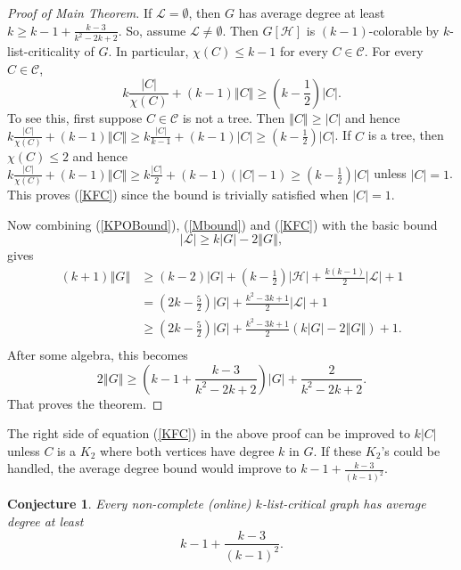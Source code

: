 \documentclass[12pt]{article}
\theoremstyle{plain}
\newtheorem*{TheConjecture}{Conjecture}
\theoremstyle{definition}
\theoremstyle{remark}
\newcommand{\fancy}[1]{\mathcal{#1}}
\newcommand{\C}[1]{\fancy{C}_{#1}}
\renewcommand{\L}{\fancy{L}}
\newcommand{\HH}{\fancy{H}}
\newcommand{\card}[1]{\left|#1\right|}
\newcommand{\size}[1]{\left\Vert#1\right\Vert}
\newcommand{\parens}[1]{\left( #1 \right)}
\def\C{\fancy{C}}
\begin{document}
\begin{proof}[Proof of Main Theorem]
	If $\L = \emptyset$, then $G$ has average degree at least $k \ge k-1 + \frac{k-3}{k^2-2k+2}$.  So, assume $\L \ne \emptyset$.  Then $G[\HH]$ is $(k-1)$-colorable by $k$-list-criticality of $G$. In particular, $\chi(C) \le k-1$ for every $C \in \C$.
	For every $C \in \C$,
	\begin{equation}
	 k\frac{\card{C}}{\chi(C)} + (k-1)\size{C} \ge \parens{k - \frac12}\card{C}.
	 \label{KFC}
	\end{equation}
	To see this, first suppose $C \in \C$ is not a tree. Then $\size{C} \ge \card{C}$ and hence $k\frac{\card{C}}{\chi(C)} + (k-1)\size{C} \ge k\frac{\card{C}}{k-1} + (k-1)\card{C} \ge (k - \frac12)\card{C}$.  If $C$ is a tree, then $\chi(C) \le 2$ and hence 
	$k\frac{\card{C}}{\chi(C)} + (k-1)\size{C} \ge k\frac{\card{C}}{2} + (k-1)(\card{C} - 1) \ge (k-\frac12)\card{C}$ unless $\card{C} = 1$.  This proves (\ref{KFC}) since the bound is trivially satisfied when $\card{C} = 1$.
	
	Now combining (\ref{KPOBound}), (\ref{Mbound}) and (\ref{KFC}) with the basic bound
	\begin{equation*}
	  \card{\L} \ge k\card{G} - 2\size{G},
	\end{equation*}	
	gives
	\begin{align*}
	(k+1)\size{G} &\ge (k-2)\card{G} + \parens{k - \frac12}\card{\HH} + \frac{k(k-1)}{2}\card{\L} + 1\\
	&= \parens{2k-\frac52}\card{G} + \frac{k^2 - 3k + 1}{2}\card{\L} + 1\\
	&\ge\parens{2k-\frac52}\card{G} + \frac{k^2 - 3k + 1}{2}\parens{k\card{G} - 2\size{G}} + 1.\\
	\end{align*}
	After some algebra, this becomes
	\begin{equation*}
		2\size{G} \ge \parens{k-1 + \frac{k-3}{k^2 -2k + 2}}\card{G} + \frac{2}{k^2 -2k + 2}.
	\end{equation*}
	That proves the theorem.
\end{proof}

The right side of equation (\ref{KFC}) in the above proof can be improved to $k\card{C}$ unless $C$ is a $K_2$ where both vertices have degree $k$ in $G$.  
If these $K_2$'s could be handled, the average degree bound would improve to $k-1 + \frac{k-3}{(k-1)^2}$.  

\begin{TheConjecture}
Every non-complete (online) $k$-list-critical graph has average degree at least \[k-1 + \frac{k-3}{(k-1)^2}.\]
\end{TheConjecture}



\end{document}
